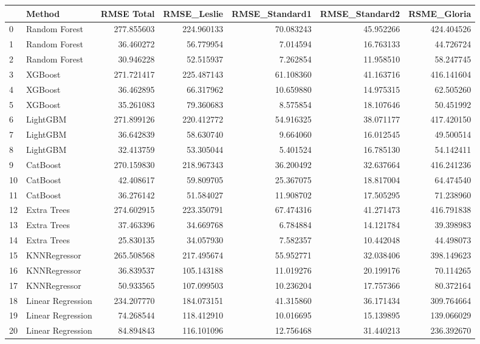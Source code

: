 \begin{tabular}{llrrrrr}
\toprule
{} &             Method &  RMSE Total &  RMSE\_Leslie &  RMSE\_Standard1 &  RMSE\_Standard2 &  RSME\_Gloria \\
\midrule
0  &      Random Forest &  277.855603 &   224.960133 &       70.083243 &       45.952266 &   424.404526 \\
1  &      Random Forest &   36.460272 &    56.779954 &        7.014594 &       16.763133 &    44.726724 \\
2  &      Random Forest &   30.946228 &    52.515937 &        7.262854 &       11.958510 &    58.247745 \\
3  &            XGBoost &  271.721417 &   225.487143 &       61.108360 &       41.163716 &   416.141604 \\
4  &            XGBoost &   36.462895 &    66.317962 &       10.659880 &       14.975315 &    62.505260 \\
5  &            XGBoost &   35.261083 &    79.360683 &        8.575854 &       18.107646 &    50.451992 \\
6  &           LightGBM &  271.899126 &   220.412772 &       54.916325 &       38.071177 &   417.420150 \\
7  &           LightGBM &   36.642839 &    58.630740 &        9.664060 &       16.012545 &    49.500514 \\
8  &           LightGBM &   32.413759 &    53.305044 &        5.401524 &       16.785130 &    54.142411 \\
9  &           CatBoost &  270.159830 &   218.967343 &       36.200492 &       32.637664 &   416.241236 \\
10 &           CatBoost &   42.408617 &    59.809705 &       25.367075 &       18.817004 &    64.474540 \\
11 &           CatBoost &   36.276142 &    51.584027 &       11.908702 &       17.505295 &    71.238960 \\
12 &        Extra Trees &  274.602915 &   223.350791 &       67.474316 &       41.271473 &   416.791838 \\
13 &        Extra Trees &   37.463396 &    34.669768 &        6.784884 &       14.121784 &    39.398983 \\
14 &        Extra Trees &   25.830135 &    34.057930 &        7.582357 &       10.442048 &    44.498073 \\
15 &       KNNRegressor &  265.508568 &   217.495674 &       55.952771 &       32.038406 &   398.149623 \\
16 &       KNNRegressor &   36.839537 &   105.143188 &       11.019276 &       20.199176 &    70.114265 \\
17 &       KNNRegressor &   50.933565 &   107.099503 &       10.236204 &       17.757366 &    80.372164 \\
18 &  Linear Regression &  234.207770 &   184.073151 &       41.315860 &       36.171434 &   309.764664 \\
19 &  Linear Regression &   74.268544 &   118.412910 &       10.016695 &       15.139895 &   139.066029 \\
20 &  Linear Regression &   84.894843 &   116.101096 &       12.756468 &       31.440213 &   236.392670 \\
\bottomrule
\end{tabular}
